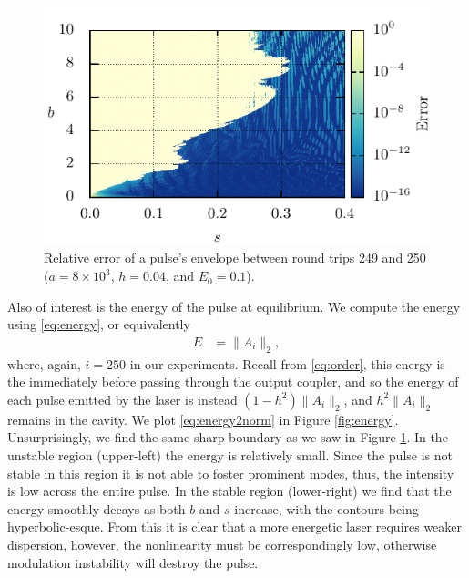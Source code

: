 \documentclass[10pt,twocolumn,a4paper]{article}
\begin{document}
\begin{figure}[tbp]
	\centering
	\includegraphics{ParamSpaceErr}
	\caption{Relative error of a pulse's envelope between round trips 249 and 250 ($a = 8 \times 10^3$, $h = 0.04$, and $E_0 = 0.1$).}
	\label{fig:error}
\end{figure}

Also of interest is the energy of the pulse at equilibrium. We compute the energy using \eqref{eq:energy}, or equivalently 
\begin{align}
	E &= \| A_i \|_2,
	\label{eq:energy2norm}
\end{align}
where, again, $i = 250$ in our experiments. Recall from \eqref{eq:order}, this energy is the immediately before passing through the output coupler, and so the energy of each pulse emitted by the laser is instead $(1 - h^2) \| A_i \|_2$, and $h^2 \| A_i \|_2$ remains in the cavity. We plot \eqref{eq:energy2norm} in Figure \ref{fig:energy}. Unsurprisingly, we find the same sharp boundary as we saw in Figure \ref{fig:error}. In the unstable region (upper-left) the energy is relatively small. Since the pulse is not stable in this region it is not able to foster prominent modes, thus, the intensity is low across the entire pulse. In the stable region (lower-right) we find that the energy smoothly decays as both $b$ and $s$ increase, with the contours being hyperbolic-esque. From this it is clear that a more energetic laser requires weaker dispersion, however, the nonlinearity must be correspondingly low, otherwise modulation instability will destroy the pulse.
\end{document}
